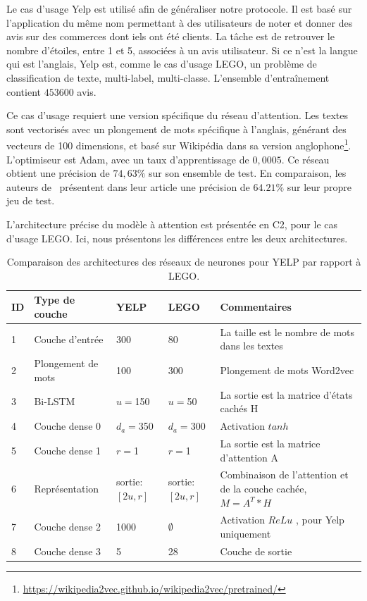 Le cas d'usage Yelp est utilisé afin de généraliser notre protocole. Il est basé sur l'application du même nom permettant à des utilisateurs de noter et donner des avis sur des commerces dont iels ont été clients. La tâche est de retrouver le nombre d'étoiles, entre 1 et 5, associées à un avis utilisateur. Si ce n'est la langue qui est l'anglais, Yelp est, comme le cas d'usage LEGO, un problème de classification de texte, multi-label, multi-classe. L'ensemble d'entraînement contient $453 600$ avis.

Ce cas d'usage requiert une version spécifique du réseau d'attention. Les textes sont vectorisés avec un plongement de mots spécifique à l'anglais, générant des vecteurs de 100 dimensions, et basé sur Wikipédia dans sa version anglophone\footnote{\url{https://wikipedia2vec.github.io/wikipedia2vec/pretrained/}}. L'optimiseur est Adam, avec un taux d'apprentissage de $0,0005$.
Ce réseau obtient une précision de $74,63\%$ sur son ensemble de test. En comparaison, les auteurs de~\cite{Lin2017} présentent dans leur article une précision de $64.21\%$ sur leur propre jeu de test.

L'architecture précise du modèle à attention est présentée en C2, pour le cas d'usage LEGO. Ici, nous présentons les différences entre les deux architectures.
\begin{table}
\caption{Comparaison des architectures des réseaux de neurones pour YELP par rapport à LEGO.}\label{model_architecture}
\begin{tabular}{|l|p{}|p{}|p{}|p{}|}
\hline
\textbf{ID} & \textbf{Type de couche} & \textbf{YELP} & \textbf{LEGO} & \textbf{Commentaires} \\ \hline
1 & Couche d'entrée    & 300  & 80  & La taille est le nombre de mots dans les textes \\ \hline
2 & Plongement de mots & 100  & 300 & Plongement de mots Word2vec\\ \hline
3 & Bi-LSTM            & $u=$150  & $u=$50  & La sortie est la matrice d'états cachés H \\ \hline
4 & Couche dense 0     & $d_a=$350  & $d_a=$300 & Activation $tanh$ \\ \hline
5 & Couche dense 1     & $r=$1    & $r=$1   &  La sortie est la matrice d'attention A \\ \hline
6 & Représentation     & sortie: $[2u,r]$ & sortie: $[2u,r]$   & Combinaison de l'attention et de la couche cachée, $M=A^T*H$  \\ \hline
7 & Couche dense 2     & 1000 &  $\emptyset$   & Activation $ReLu$ , pour Yelp uniquement \\ \hline
8 & Couche dense 3     & 5    & 28  & Couche de sortie \\ \hline
\end{tabular}
\end{table}

